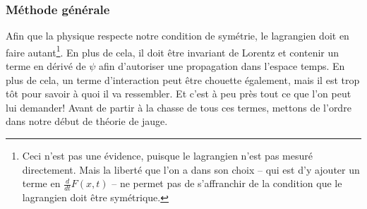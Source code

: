             \subsubsection{Méthode générale}
                Afin que la physique respecte notre condition de symétrie, le lagrangien doit en faire autant\footnote{Ceci n'est pas une évidence, puisque le lagrangien n'est pas mesuré directement. Mais la liberté que l'on a dans son choix -- qui est d'y ajouter un terme en $\frac{d}{dt}F(x,t)$ -- ne permet pas de s'affranchir de la condition que le lagrangien doit être symétrique.}. En plus de cela, il doit être invariant de Lorentz et contenir un terme en dérivé de $\psi$ afin d'autoriser une propagation dans l'espace temps. En plus de cela, un terme d'interaction peut être chouette également, mais il est trop tôt pour savoir à quoi il va ressembler. Et c'est à peu près tout ce que l'on peut lui demander! Avant de partir à la chasse de tous ces termes, mettons de l'ordre dans notre début de théorie de jauge.\\
                
